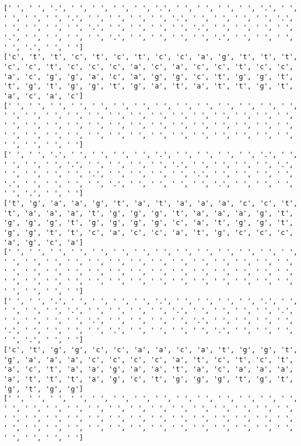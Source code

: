 \documentclass{article}
\begin{document}
\begin{Verbatim}
[' ', ' ', '.', ' ', ' ', ' ', ' ', '.', ' ', ' ', ' ', ' ', '.', ' ', ' ', ' ', ' ', '.', ' ', ' ', ' ', ' ', '.', ' ', ' ', ' ', ' ', '.', ' ', ' ', ' ', ' ', '.', ' ', ' ', ' ', ' ', '.', ' ', ' ', ' ', ' ', '.', ' ', ' ', ' ', ' ', '.', ' ', ' ', ' ', ' ', '.', ' ', ' ', ' ', ' ', '.', ' ', ' ']
['c', 't', 't', 'c', 't', 'c', 't', 'c', 'c', 'a', 'g', 't', 't', 't', 'c', 'c', 't', 'c', 'c', 'c', 'a', 'c', 'a', 'c', 'c', 't', 'c', 'c', 'a', 'c', 'g', 'g', 'a', 'c', 'a', 'g', 'g', 'c', 't', 'g', 'g', 't', 't', 'g', 't', 'g', 'g', 't', 'g', 'a', 't', 'a', 't', 't', 'g', 't', 'a', 'c', 'a', 'c']
[' ', ' ', ' ', ' ', ' ', ' ', ' ', ' ', ' ', ' ', ' ', ' ', ' ', ' ', ' ', ' ', ' ', ' ', ' ', ' ', ' ', ' ', ' ', ' ', ' ', ' ', ' ', ' ', ' ', ' ', ' ', ' ', ' ', ' ', ' ', ' ', ' ', ' ', ' ', ' ', ' ', ' ', ' ', ' ', ' ', ' ', ' ', ' ', ' ', ' ', ' ', ' ', ' ', ' ', ' ', ' ', ' ', ' ', ' ', ' ']
[' ', ' ', '.', ' ', ' ', ' ', ' ', '.', ' ', ' ', ' ', ' ', '.', ' ', ' ', ' ', ' ', '.', ' ', ' ', ' ', ' ', '.', ' ', ' ', ' ', ' ', '.', ' ', ' ', ' ', ' ', '.', ' ', ' ', ' ', ' ', '.', ' ', ' ', ' ', ' ', '.', ' ', ' ', ' ', ' ', '.', ' ', ' ', ' ', ' ', '.', ' ', ' ', ' ', ' ', '.', ' ', ' ']
['t', 'g', 'a', 'a', 'g', 't', 'a', 't', 'a', 'a', 'a', 'c', 'c', 't', 't', 'a', 'a', 'a', 't', 'g', 'g', 'g', 't', 'a', 'a', 'a', 'g', 't', 'g', 'g', 'g', 't', 'g', 'g', 'g', 'g', 'c', 'a', 't', 'g', 'g', 't', 'g', 'g', 't', 't', 'c', 'a', 'c', 'c', 'a', 't', 'g', 'c', 'c', 'c', 'a', 'g', 'c', 'a']
[' ', ' ', ' ', ' ', ' ', ' ', ' ', ' ', ' ', ' ', ' ', ' ', ' ', ' ', ' ', ' ', ' ', ' ', ' ', ' ', ' ', ' ', ' ', ' ', ' ', ' ', ' ', ' ', ' ', ' ', ' ', ' ', ' ', ' ', ' ', ' ', ' ', ' ', ' ', ' ', ' ', ' ', ' ', ' ', ' ', ' ', ' ', ' ', ' ', ' ', ' ', ' ', ' ', ' ', ' ', ' ', ' ', ' ', ' ', ' ']
[' ', ' ', '.', ' ', ' ', ' ', ' ', '.', ' ', ' ', ' ', ' ', '.', ' ', ' ', ' ', ' ', '.', ' ', ' ', ' ', ' ', '.', ' ', ' ', ' ', ' ', '.', ' ', ' ', ' ', ' ', '.', ' ', ' ', ' ', ' ', '.', ' ', ' ', ' ', ' ', '.', ' ', ' ', ' ', ' ', '.', ' ', ' ', ' ', ' ', '.', ' ', ' ', ' ', ' ', '.', ' ', ' ']
['c', 't', 'g', 'g', 'c', 'c', 'a', 'a', 'c', 'a', 't', 'g', 'g', 't', 'g', 'a', 'a', 'a', 'c', 'c', 'c', 'c', 'a', 't', 'c', 't', 'c', 't', 'a', 'c', 't', 'a', 'a', 'g', 'a', 'a', 't', 'a', 'c', 'a', 'a', 'a', 'a', 't', 't', 't', 'a', 'g', 'c', 't', 'g', 'g', 'g', 't', 'g', 't', 'g', 't', 'g', 'g']
[' ', ' ', ' ', ' ', ' ', ' ', ' ', ' ', ' ', ' ', ' ', ' ', ' ', ' ', ' ', ' ', ' ', ' ', ' ', ' ', ' ', ' ', ' ', ' ', ' ', ' ', ' ', ' ', ' ', ' ', ' ', ' ', ' ', ' ', ' ', ' ', ' ', ' ', ' ', ' ', ' ', ' ', ' ', ' ', ' ', ' ', ' ', ' ', ' ', ' ', ' ', ' ', ' ', ' ', ' ', ' ', ' ', ' ', ' ', ' ']

\end{Verbatim}
\end{document}

